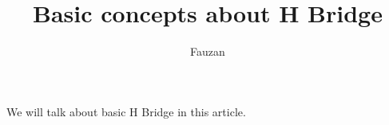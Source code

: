 \documentclass{article}
\title{Basic concepts about H Bridge}, \author{Fauzan}
\begin{document}
\maketitle
We will talk about basic H Bridge in this article.
\end{document}
